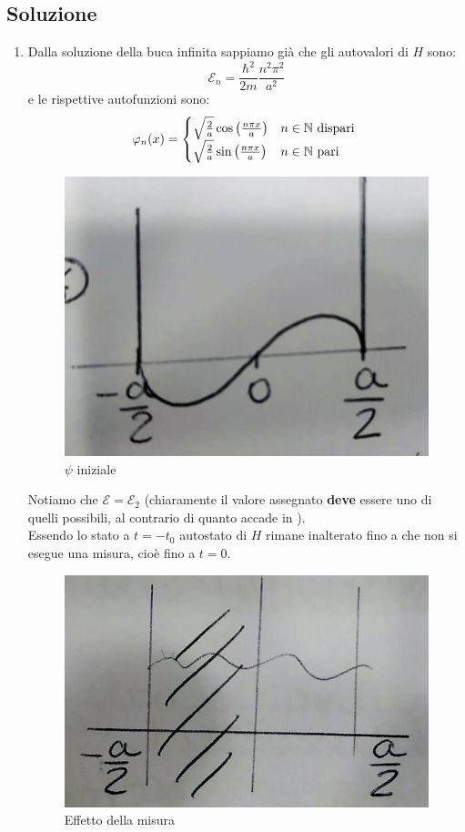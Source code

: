 \documentclass[../../FisicaTeorica.tex]{subfiles}
\begin{document}
\subsection{Soluzione}
\begin{enumerate}
\item Dalla soluzione della buca infinita sappiamo già che gli autovalori di $H$ sono:
\[
\mathcal{E}_n = \frac{\hbar^2}{2m}\frac{n^2 \pi^2}{a^2}
\]
e le rispettive autofunzioni sono:
\[
\varphi_n(x)=\begin{cases}
\sqrt{\frac{2}{a}}\cos\left(\frac{n\pi x}{a}\right) & n \in \mathbb{N} \text{ dispari }\\
\sqrt{\frac{2}{a}}\sin\left(\frac{n\pi x}{a}\right) & n\in \mathbb{N} \text{ pari}
\end{cases}
\]
\begin{figure}[H]
\centering
\includegraphics[scale=0.4]{Immagini/15_11/img2.jpeg}
\caption{$\psi$ iniziale}
\end{figure}
Notiamo che $\mathcal{E}=\mathcal{E}_2$ (chiaramente il valore assegnato \textbf{deve} essere uno di quelli possibili, al contrario di quanto accade in \MC).\\
Essendo lo stato a $t=-t_0$ autostato di $H$ rimane inalterato fino a che non si esegue una misura, cioè fino a $t=0$.\\
\begin{figure}[H]
\centering
\includegraphics[scale=0.4]{Immagini/15_11/img1.jpeg}
\caption{Effetto della misura}
\end{figure}


\end{enumerate}
\end{document}
